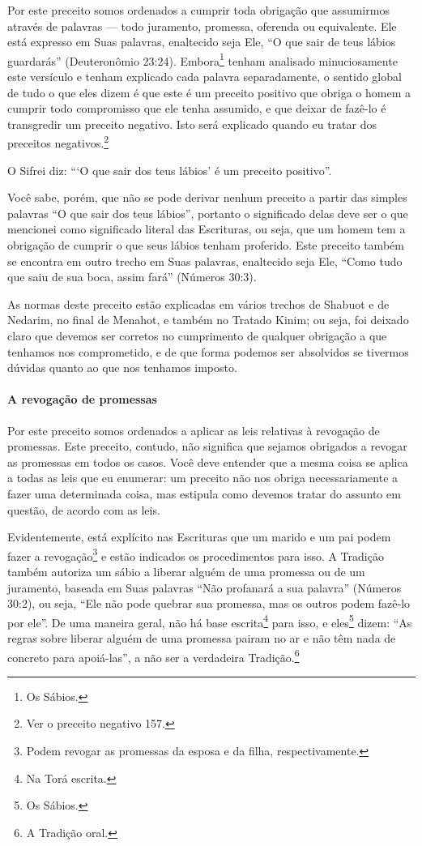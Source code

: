 Por este preceito somos ordenados a cumprir toda obrigação que
assumirmos através de palavras --- todo juramento, promessa, oferenda ou
equivalente. Ele está expresso em Suas palavras, enaltecido seja Ele, ``O
que sair de teus lábios guardarás'' (Deuteronômio 23:24).
Embora\footnote{Os Sábios.} tenham analisado minuciosamente este versículo e tenham explicado cada palavra separadamente,
o sentido global de tudo o que eles dizem é que este é um preceito
positivo que obriga o homem a cumprir todo compromisso que ele tenha
assumido, e que deixar de fazê-lo é transgredir um preceito negativo.
Isto será explicado quando eu tratar dos preceitos
negativos.\footnote{Ver o preceito negativo 157.}

O Sifrei diz: ```O que sair dos teus lábios' é um preceito positivo''.

Você sabe, porém, que não se pode derivar nenhum preceito a partir das
simples palavras ``O que sair dos teus lábios'', portanto o significado
delas deve ser o que mencionei como significado literal das Escrituras,
ou seja, que um homem tem a obrigação de cumprir o que seus lábios
tenham proferido. Este preceito também se encontra em outro trecho em
Suas palavras, enaltecido seja Ele, ``Como tudo que saiu de sua boca,
assim fará'' (Números 30:3).

As normas deste preceito estão explicadas em vários trechos de Shabuot
e de Nedarim, no final de Menahot, e também no Tratado Kinim; ou seja,
foi deixado claro que devemos ser corretos no cumprimento de qualquer
obrigação a que tenhamos nos comprometido, e de que forma podemos ser
absolvidos se tivermos dúvidas quanto ao que nos tenhamos imposto.

\paragraph{A revogação de promessas}

Por este preceito somos ordenados a aplicar as leis relativas à
revogação de promessas. Este preceito, contudo, não significa que
sejamos obrigados a revogar as promessas em todos os casos. Você deve
entender que a mesma coisa se aplica a todas as leis que eu enumerar:
um preceito não nos obriga necessariamente a fazer uma determinada
coisa, mas estipula como devemos tratar do assunto em questão, de acordo
com as leis.

Evidentemente, está explícito nas Escrituras que um marido e um pai
podem fazer a revogação\footnote{Podem revogar as promessas da esposa e da filha, respectivamente.} e estão indicados os
procedimentos para isso. A Tradição também autoriza um sábio a liberar alguém de uma promessa ou de um
juramento, baseada em Suas palavras ``Não profanará a sua palavra''
(Números 30:2), ou seja, ``Ele não pode quebrar sua promessa, mas os outros podem
fazê-lo por ele''. De uma maneira geral, não há base
escrita\footnote{Na Torá escrita.} para isso, e eles\footnote{Os Sábios.} dizem: ``As regras sobre liberar alguém de uma promessa pairam no ar e não têm
nada de concreto para apoiá-las'', a não ser a verdadeira
Tradição.\footnote{A Tradição oral.}

